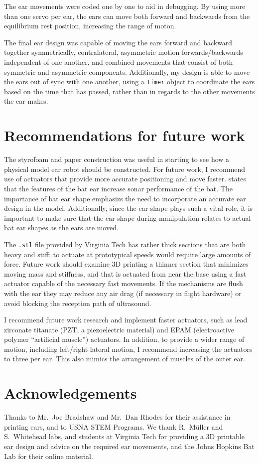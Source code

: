 \documentclass{article}
\begin{document}
The ear movements were coded one by one to aid in debugging. By using more than one servo per ear, the ears can move both forward and backwards from the equilibrium rest position, increasing the range of moton.  

The final ear design was capable of moving the ears forward and backward together symmetrically, contralateral, asymmetric motion forwards/backwards independent of one another, and combined movements that consist of both symmetric and asymmetric components. Additionally, my design is able to move the ears out of sync with one another, using a \lstinline{Timer} object to coordinate the ears based on the time that has passed, rather than in regards to the other movements the ear makes.  






\section{Recommendations for future work}
The styrofoam and paper construction was useful in starting to see how a physical model ear robot should be constructed. For future work, I recommend use of actuators that provide more accurate positioning and move faster. \citep{pannala2013interplay} states that the features of the bat ear increase sonar performance of the bat. The importance of bat ear shape emphasizs the need to incorporate an accurate ear design in the model. Additionally, since the ear shape plays such a vital role, it is important to make sure that the ear shape during manipulation relates to actual bat ear shapes as the ears are moved. 

The \lstinline{.stl} file provided by Virginia Tech has rather thick sections that are both heavy and stiff; to actuate at prototypical speeds would require large amounts of force.  Future work should examine 3D printing a thinner section that minimizes moving mass and stiffness, and that is actuated from near the base using a fast actuator capable of the necessary fast movements. If the mechanisms are flush with the ear they may reduce any air drag (if necessary in flight hardware) or avoid blocking the reception path of ultrasound. 

I recommend future work research and implement faster actuators, such as lead zirconate titanate (PZT, a piezoelectric material) and EPAM (electroactive polymer ``artificial muscle'') actuators. In addition, to provide a wider range of motion, including left/right lateral motion, I recommend increasing the actuators to three per ear. This also mimics the arrangement of muscles of the outer ear. 

\section*{Acknowledgements}
Thanks to Mr.~Joe Bradshaw and Mr.~Dan Rhodes for their assistance in printing ears, and to USNA STEM Programs. We thank R.~M{\"u}ller and S.~Whitehead labs, and students at Virginia Tech for providing a 3D printable ear design and advice on the required ear movements, and the Johns Hopkins Bat Lab for their online material. 


\end{document}
